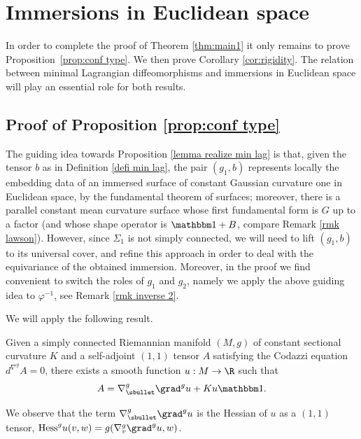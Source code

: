 \section{Immersions in Euclidean space}\label{sec:surfaces}

In order to complete the proof of Theorem \ref{thm:main1} it only remains to prove Proposition~\ref{prop:conf type}. We then prove Corollary \ref{cor:rigidity}. The relation between minimal Lagrangian diffeomorphisms and immersions in Euclidean space will play an essential role for both results.

\subsection{Proof of Proposition \ref{prop:conf type}}

The guiding idea towards Proposition \ref{lemma realize min lag} is that, given the tensor $b$ as in Definition \ref{defi min lag}, the pair $(g_1,b)$ represents locally the embedding data of an immersed surface of constant Gaussian curvature one in Euclidean space, by the fundamental theorem of surfaces; moreover, there is a parallel constant mean curvature surface whose first fundamental form is $G$ up to a factor (and whose shape operator is $\mathbbm 1+B$, compare Remark \ref{rmk lawson}). However, since $\Sigma_1$ is not simply connected, we will need to lift $(g_1,b)$ to its universal cover, and refine this approach in order to deal with the equivariance of the obtained immersion. Moreover, in the proof we find convenient to switch the roles of $g_1$ and $g_2$, namely we apply the above guiding idea to $\varphi^{-1}$, see Remark \ref{rmk inverse 2}.

We will apply the following result.

\begin{lemma} \label{lemma codazzi}
Given a simply connected Riemannian manifold $(M,g)$ of constant sectional curvature $K$ and a self-adjoint $(1,1)$ tensor $A$ satisfying the Codazzi equation $d^{\nabla^g}\!A=0$, there exists a smooth function $u:M\to\R$ such that
\[
A=\nabla^g_\sbullet\grad^gu+Ku\mathbbm 1.
\]
\end{lemma}

We observe that the term $\nabla^g_\sbullet\grad^gu$ is the Hessian of $u$ as a $(1,1)$ tensor, \ie $\mathrm{Hess}^g u(v,w)=g(\nabla^g_v\grad^gu,w)$.

